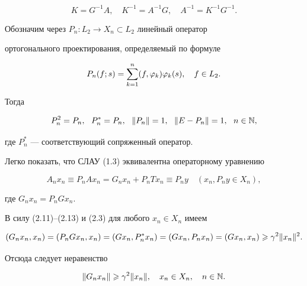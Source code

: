\begin{equation}


K = G^{-1}A,\quad K^{-1} = A^{-1}G,\quad A^{-1} = K^{-1}G^{-1}.


\end{equation}





Обозначим через $P_n:L_2\to X_n \subset L_2$ линейный оператор


ортогонального проектирования, определяемый по формуле


\begin{equation}


P_n(f;s) = \suml_{k=1}^n(f,\vp_k)\vp_k(s),\quad f\in L_2.


\end{equation}


Тогда


\begin{equation}


P_n^2=P_n, \ \ P_n^*=P_n, \ \ \|P_n\|=1,\ \ \|E-P_n\|=1,\ \ n\in \N,


\end{equation}


где $P_n^*$ --- соответствующий сопряженный оператор.





Легко показать, что СЛАУ (1.3) эквивалентна операторному уравнению


\begin{equation}


A_nx_n\equiv P_nA x_n = G_nx_n + P_nTx_n \equiv P_n y \quad(x_n, P_ny\in


X_n),


\end{equation}


где $G_nx_n = P_nG x_n$.


В силу (2.11)--(2.13) и (2.3) для любого $x_n\in X_n$ имеем


\begin{equation}


(G_nx_n,x_n) = (P_nGx_n,x_n)=(Gx_n,P_n^*x_n)=(Gx_n,P_nx_n)=(Gx_n,x_n)\gea


\gamma^2\|x_n\|^2.


\end{equation}


Отсюда следует неравенство


\begin{equation}


\|G_nx_n\|\gea \gamma^2\|x_n\|,\quad x_n\in X_n,\quad n\in \N.


\end{equation}


